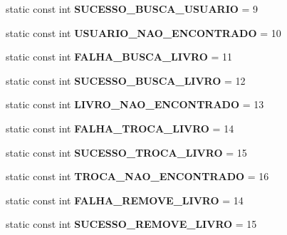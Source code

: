 \begin{DoxyCompactItemize}
\item 
\mbox{\label{classResultado_aa09cc749e044cf8023941a8170109a19}} 
static const int {\bfseries S\+U\+C\+E\+S\+S\+O\+\_\+\+B\+U\+S\+C\+A\+\_\+\+U\+S\+U\+A\+R\+IO} = 9
\item 
\mbox{\label{classResultado_a1fe9b4821b17f229b86b7d9ec0d924f0}} 
static const int {\bfseries U\+S\+U\+A\+R\+I\+O\+\_\+\+N\+A\+O\+\_\+\+E\+N\+C\+O\+N\+T\+R\+A\+DO} = 10
\item 
\mbox{\label{classResultado_a8a027a5d7f34af6e23920ea7f165c7a5}} 
static const int {\bfseries F\+A\+L\+H\+A\+\_\+\+B\+U\+S\+C\+A\+\_\+\+L\+I\+V\+RO} = 11
\item 
\mbox{\label{classResultado_a16a24484c742f4ef6279047e1496f117}} 
static const int {\bfseries S\+U\+C\+E\+S\+S\+O\+\_\+\+B\+U\+S\+C\+A\+\_\+\+L\+I\+V\+RO} = 12
\item 
\mbox{\label{classResultado_a47b88abe70e197311a76093b4083eea8}} 
static const int {\bfseries L\+I\+V\+R\+O\+\_\+\+N\+A\+O\+\_\+\+E\+N\+C\+O\+N\+T\+R\+A\+DO} = 13
\item 
\mbox{\label{classResultado_a492d05d17c31be790c473c847666d7f8}} 
static const int {\bfseries F\+A\+L\+H\+A\+\_\+\+T\+R\+O\+C\+A\+\_\+\+L\+I\+V\+RO} = 14
\item 
\mbox{\label{classResultado_afd82b29826fc7f5c2efe508652c2c890}} 
static const int {\bfseries S\+U\+C\+E\+S\+S\+O\+\_\+\+T\+R\+O\+C\+A\+\_\+\+L\+I\+V\+RO} = 15
\item 
\mbox{\label{classResultado_abd7ba2d8f693cac5edcb3257cb318a56}} 
static const int {\bfseries T\+R\+O\+C\+A\+\_\+\+N\+A\+O\+\_\+\+E\+N\+C\+O\+N\+T\+R\+A\+DO} = 16
\item 
\mbox{\label{classResultado_a35d10272f5148ef9281f39a7a42d3e4c}} 
static const int {\bfseries F\+A\+L\+H\+A\+\_\+\+R\+E\+M\+O\+V\+E\+\_\+\+L\+I\+V\+RO} = 14
\item 
\mbox{\label{classResultado_af113596d640fe8cd7536d1e1b00de23d}} 
static const int {\bfseries S\+U\+C\+E\+S\+S\+O\+\_\+\+R\+E\+M\+O\+V\+E\+\_\+\+L\+I\+V\+RO} = 15
\end{DoxyCompactItemize}
